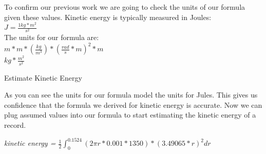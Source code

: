 \documentclass[a4paper, 11pt, oneside]{book} %
\begin{document}
To confirm our previous work we are going to check the units of our formula given these values. Kinetic energy is typically measured in Joules: \\
\vspace{0.5\baselineskip} %
\vspace{0.5\baselineskip} %
$J=\frac{1kg*m^2}{s^2}$\\
\vspace{0.5\baselineskip} %
\vspace{0.5\baselineskip} %
The units for our formula are:\\
\vspace{0.5\baselineskip} %
\vspace{0.5\baselineskip} %
$m*m*(\frac{kg}{m^3})*(\frac{rad}{s} * m)^2*m$\\
\vspace{0.5\baselineskip} %
\vspace{0.5\baselineskip} %
$kg*\frac{m^2}{s^2}$\\ 
\vspace{0.5\baselineskip} %
\vspace{0.5\baselineskip} %

{\LARGE Estimate Kinetic Energy \\} %
\vspace{0.5\baselineskip} %
\vspace{0.5\baselineskip} %

As you can see the units for our formula model the units for Jules. This gives us confidence that the formula we derived for kinetic energy is accurate. Now we can plug assumed values into our formula to start estimating the kinetic energy of a record.\\

\vspace{0.5\baselineskip} %
\vspace{0.5\baselineskip} %

\textit{kinetic energy = $\frac{1}{2}\int_{0}^{0.1524}(2\pi r * 0.001*1350) * (3.49065 * r)^2 dr$}\\

\vspace{0.5\baselineskip} %
\vspace{0.5\baselineskip} %
\end{document}
